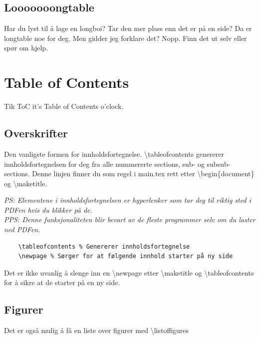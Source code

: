     \subsection{Looooooongtable}
        Har du lyst til å lage en longboi? Tar den mer plass enn det er på en side? Da er longtable noe for deg. Men gidder jeg forklare det? Nopp. Finn det ut selv eller spør om hjelp.

        
    
    
\section{Table of Contents}
    Tik ToC it's Table of Contents o'clock.
    \subsection{Overskrifter}
        Den vanligste formen for innholdsfortegnelse. \textbackslash tableofcontents genererer innholdsfortegnelsen for deg fra alle nummererte sections, sub- og subsub-sections. Denne linjen finner du som regel i main.tex rett etter \textbackslash begin\{document\} og \textbackslash maketitle. 
        
        \textit{PS: Elementene i innholdsfortegnelsen er hyperlenker som tar deg til riktig sted i PDFen hvis du klikker på de.\\
        PPS: Denne funksjonaliteten blir bevart av de fleste programmer selv om du laster ned PDFen.}
        
        \begin{verbatim}
    \tableofcontents % Genererer innholdsfortegnelse
    \newpage % Sørger for at følgende innhold starter på ny side
        \end{verbatim}
        
        Det er ikke uvanlig å slenge inn en \textbackslash newpage etter \textbackslash maketitle og \textbackslash tableofcontents for å sikre at de starter på en ny side.
        
    \subsection{Figurer}
        Det er også mulig å få en liste over figurer med \textbackslash listoffigures 
        \listoffigures
         
